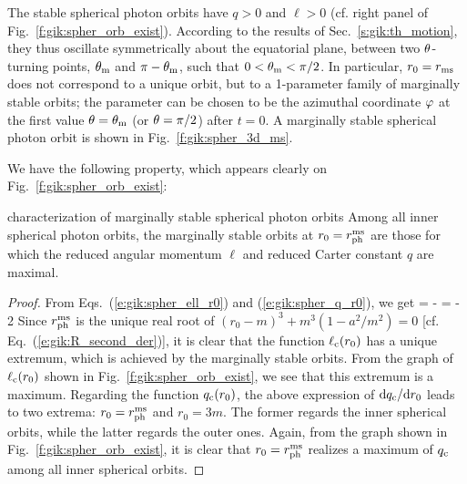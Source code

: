 The stable spherical photon orbits have $q>0$ and $\ell > 0$
(cf. right panel of Fig.~\ref{f:gik:spher_orb_exist}).
According to the results of Sec.~\ref{s:gik:th_motion}, they
thus oscillate symmetrically about the equatorial plane, between
two $\theta$-turning points, $\theta_{\rm m}$ and $\pi-\theta_{\rm m}$, such that $0<\theta_{\rm m}<\pi/2$.
In particular, $r_0 = r_{\rm ms}$ does not correspond to a unique orbit, but
to a 1-parameter family of marginally stable orbits; the parameter can be chosen
to be the azimuthal coordinate $\varphi$ at the first value $\theta=\theta_{\rm m}$ (or $\theta=\pi/2$)
after $t=0$. A marginally stable spherical photon orbit is
shown in Fig.~\ref{f:gik:spher_3d_ms}.

We have the following property, which appears clearly on Fig.~\ref{f:gik:spher_orb_exist}:
\begin{tprop}{characterization of marginally stable spherical photon orbits}{}
Among all inner spherical photon orbits, the marginally stable orbits
at $r_0 = r_{\rm ph}^{\rm ms}$ are those for which the reduced angular momentum $\ell$
and reduced Carter constant $q$ are maximal.
\end{tprop}

\begin{proof}
From Eqs.~(\ref{e:gik:spher_ell_r0}) and (\ref{e:gik:spher_q_r0}), we get
\be \label{e:gik:spher_orb_dqdr}
    = - 
\ee
\be
    = - 2 
\ee
Since $r_{\rm ph}^{\rm ms}$ is the unique real root of
$(r_0 - m)^3 + m^3 (1 - a^2/m^2) = 0$ [cf. Eq.~(\ref{e:gik:R_second_der})],
it is clear that the function $\ell_{\rm c}(r_0)$ has a unique extremum, which is
achieved by the marginally stable orbits. From the graph of $\ell_{\rm c}(r_0)$
shown in Fig.~\ref{f:gik:spher_orb_exist}, we see that this extremum is
a maximum. Regarding the function $q_{\rm c}(r_0)$, the above expression of $\mathrm{d} q_{\rm c}/\mathrm{d} r_0$
leads to two extrema: $r_0 = r_{\rm ph}^{\rm ms}$ and $r_0 = 3 m$.
The former regards the inner spherical orbits, while the latter regards
the outer ones. Again, from the graph shown in Fig.~\ref{f:gik:spher_orb_exist},
it is clear that $r_0 = r_{\rm ph}^{\rm ms}$ realizes a maximum of $q_{\rm c}$
among all inner spherical orbits.
\end{proof}

